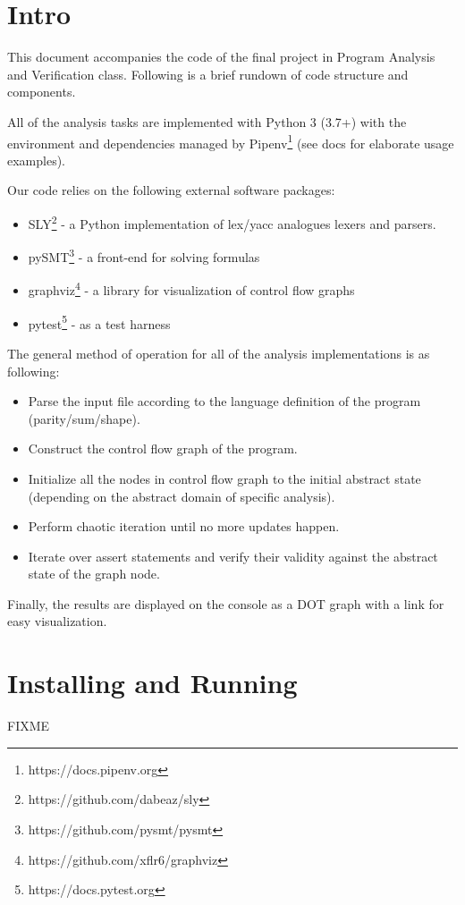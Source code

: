 \documentclass[12pt,a4paper]{article}
\begin{document}
	\section*{Intro}
	This document accompanies the code of the final project in Program Analysis and Verification class. Following is a brief rundown of code structure and components.
	
	All of the analysis tasks are implemented with Python 3 (3.7+) with the environment and dependencies managed by Pipenv\footnote{https://docs.pipenv.org} (see docs for elaborate usage examples).
	
	Our code relies on the following external software packages:
	\begin{itemize}
		\item SLY\footnote{https://github.com/dabeaz/sly} - a Python implementation of lex/yacc analogues lexers and parsers.
		\item pySMT\footnote{https://github.com/pysmt/pysmt} - a front-end for solving formulas
		\item graphviz\footnote{https://github.com/xflr6/graphviz} - a library for visualization of control flow graphs
		\item pytest\footnote{https://docs.pytest.org} - as a test harness
	\end{itemize}
The general method of operation for all of the analysis implementations is as following:
\begin{itemize}
	\item Parse the input file according to the language definition of the program (parity/sum/shape).
	\item Construct the control flow graph of the program.
	\item Initialize all the nodes in control flow graph to the initial abstract state (depending on the abstract domain of specific analysis).
	\item Perform chaotic iteration until no more updates happen.
	\item Iterate over assert statements and verify their validity against the abstract state of the graph node.
\end{itemize}
Finally, the results are displayed on the console as a DOT graph with a link for easy visualization.

\section*{Installing and Running}
FIXME

\end{document}
